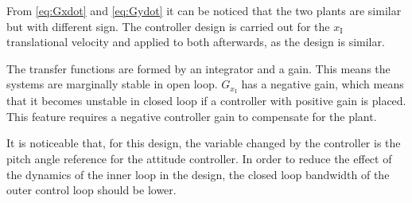 From \autoref{eq:Gxdot} and \ref{eq:Gydot} it can be noticed that the two plants are similar but with different sign. The controller design is carried out for the $x_{\mathrm{I}}$ translational velocity and applied to both afterwards, as the design is similar.

The transfer functions are formed by an integrator and a gain. This means the systems are marginally stable in open loop. $G_{x_{\mathrm{I}}}$ has a negative gain, which means that it becomes unstable in closed loop if a controller with positive gain is placed. This feature requires a negative controller gain to compensate for the plant.

It is noticeable that, for this design, the variable changed by the controller is the pitch angle reference for the attitude controller. In order to reduce the effect of the dynamics of the inner loop in the design, the closed loop bandwidth of the outer control loop should be lower.

